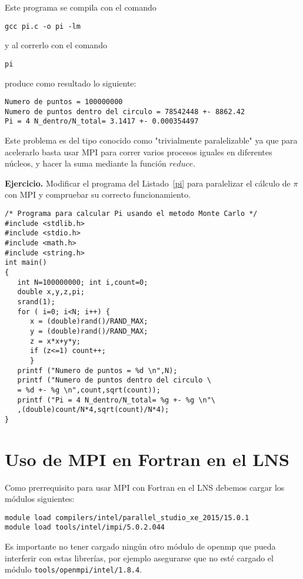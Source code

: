 \documentclass[letter]{jpconf}
\begin{document}
Este programa se compila con el comando
\color{blue}
\begin{verbatim}
gcc pi.c -o pi -lm
\end{verbatim}
\color{black}
y al correrlo con el comando 
\color{blue}
\begin{verbatim}
pi
\end{verbatim}
\color{black}
produce como resultado lo siguiente:
\color{brown}
\begin{verbatim}
Numero de puntos = 100000000 
Numero de puntos dentro del circulo = 78542448 +- 8862.42 
Pi = 4 N_dentro/N_total= 3.1417 +- 0.000354497 
\end{verbatim}
\color{black}

Este problema es del tipo conocido como "trivialmente paralelizable" ya que para acelerarlo basta usar MPI para correr varios procesos iguales en diferentes n\'ucleos, y 
hacer la suma mediante la funci\'on $reduce$. 

\textbf{Ejercicio.}  Modificar el programa del Listado~\ref{pi}  para paralelizar el c\'alculo de $\pi$ con MPI y compruebar su correcto funcionamiento.


\begin{lstlisting}[float,floatplacement=H,label=pi,caption=Listado del programa  secuencial que calcula $\pi$ en C.]
/* Programa para calcular Pi usando el metodo Monte Carlo */
#include <stdlib.h>
#include <stdio.h>
#include <math.h>
#include <string.h>
int main()
{
   int N=100000000; int i,count=0;
   double x,y,z,pi;
   srand(1);
   for ( i=0; i<N; i++) {
      x = (double)rand()/RAND_MAX;
      y = (double)rand()/RAND_MAX;
      z = x*x+y*y;
      if (z<=1) count++;
      }
   printf ("Numero de puntos = %d \n",N);
   printf ("Numero de puntos dentro del circulo \
   = %d +- %g \n",count,sqrt(count));
   printf ("Pi = 4 N_dentro/N_total= %g +- %g \n"\
   ,(double)count/N*4,sqrt(count)/N*4);
}
\end{lstlisting}



\section{\label{seccionFortran} Uso de MPI en Fortran en el LNS}

Como prerrequisito para usar MPI con Fortran en el LNS debemos cargar los m\'odulos siguientes:
\color{blue}
\begin{verbatim}
module load compilers/intel/parallel_studio_xe_2015/15.0.1
module load tools/intel/impi/5.0.2.044
\end{verbatim}
\color{black}
Es importante no tener cargado ning\'un otro m\'odulo de openmp que pueda interferir con estas librer\'ias, por ejemplo asegurarse que no est\'e cargado el m\'odulo 
\texttt{tools/openmpi/intel/1.8.4}.
\end{document}
